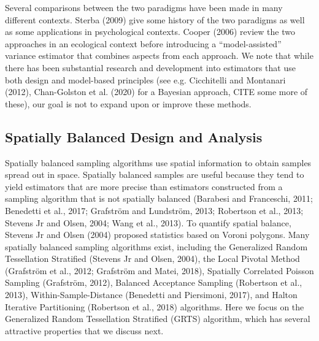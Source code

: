 \documentclass[]{elsarticle} %
\begin{document}
Several comparisons between the two paradigms have been made in many
different contexts. Sterba (2009) give some history of the two paradigms
as well as some applications in psychological contexts. Cooper (2006)
review the two approaches in an ecological context before introducing a
``model-assisted'' variance estimator that combines aspects from each
approach. We note that while there has been substantial research and
development into estimators that use both design and model-based
principles (see e.g. Cicchitelli and Montanari (2012), Chan-Golston et
al. (2020) for a Bayesian approach, CITE some more of these), our goal
is not to expand upon or improve these methods.

\hypertarget{spatially-balanced-design-and-analysis}{%
\subsection{Spatially Balanced Design and
Analysis}\label{spatially-balanced-design-and-analysis}}

Spatially balanced sampling algorithms use spatial information to obtain
samples spread out in space. Spatially balanced samples are useful
because they tend to yield estimators that are more precise than
estimators constructed from a sampling algorithm that is not spatially
balanced (Barabesi and Franceschi, 2011; Benedetti et al., 2017;
Grafström and Lundström, 2013; Robertson et al., 2013; Stevens Jr and
Olsen, 2004; Wang et al., 2013). To quantify spatial balance, Stevens Jr
and Olsen (2004) proposed statistics based on Voroni polygons. Many
spatially balanced sampling algorithms exist, including the Generalized
Random Tessellation Stratified (Stevens Jr and Olsen, 2004), the Local
Pivotal Method (Grafström et al., 2012; Grafström and Matei, 2018),
Spatially Correlated Poisson Sampling (Grafström, 2012), Balanced
Acceptance Sampling (Robertson et al., 2013), Within-Sample-Distance
(Benedetti and Piersimoni, 2017), and Halton Iterative Partitioning
(Robertson et al., 2018) algorithms. Here we focus on the Generalized
Random Tessellation Stratified (GRTS) algorithm, which has several
attractive properties that we discuss next.
\end{document}
